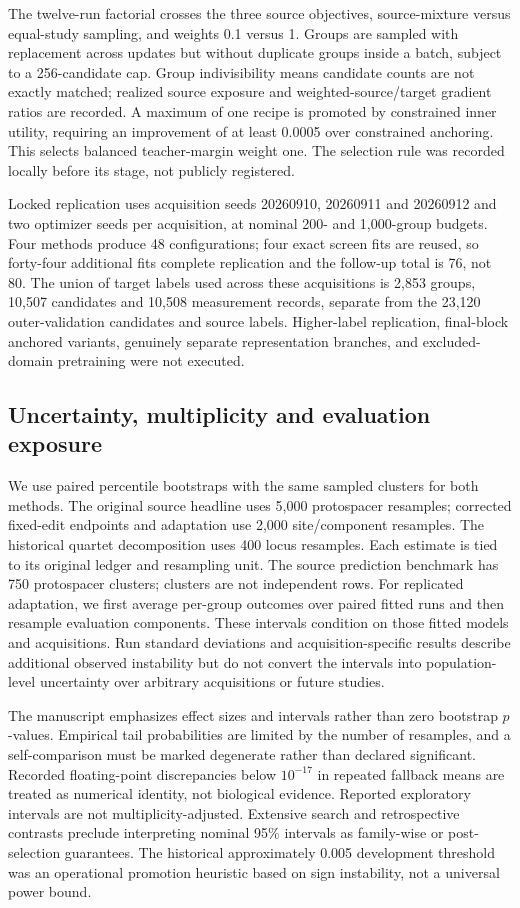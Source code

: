 The twelve-run factorial crosses the three source objectives, source-mixture versus equal-study sampling, and weights 0.1 versus 1. Groups are sampled with replacement across updates but without duplicate groups inside a batch, subject to a 256-candidate cap. Group indivisibility means candidate counts are not exactly matched; realized source exposure and weighted-source/target gradient ratios are recorded. A maximum of one recipe is promoted by constrained inner utility, requiring an improvement of at least 0.0005 over constrained anchoring. This selects balanced teacher-margin weight one. The selection rule was recorded locally before its stage, not publicly registered.

Locked replication uses acquisition seeds 20260910, 20260911 and 20260912 and two optimizer seeds per acquisition, at nominal 200- and 1,000-group budgets. Four methods produce 48 configurations; four exact screen fits are reused, so forty-four additional fits complete replication and the follow-up total is 76, not 80. The union of target labels used across these acquisitions is 2,853 groups, 10,507 candidates and 10,508 measurement records, separate from the 23,120 outer-validation candidates and source labels. Higher-label replication, final-block anchored variants, genuinely separate representation branches, and excluded-domain pretraining were not executed.

\subsection{Uncertainty, multiplicity and evaluation exposure}
We use paired percentile bootstraps with the same sampled clusters for both methods. The original source headline uses 5,000 protospacer resamples; corrected fixed-edit endpoints and adaptation use 2,000 site/component resamples. The historical quartet decomposition uses 400 locus resamples. Each estimate is tied to its original ledger and resampling unit. The source prediction benchmark has 750 protospacer clusters; clusters are not independent rows. For replicated adaptation, we first average per-group outcomes over paired fitted runs and then resample evaluation components. These intervals condition on those fitted models and acquisitions. Run standard deviations and acquisition-specific results describe additional observed instability but do not convert the intervals into population-level uncertainty over arbitrary acquisitions or future studies.

The manuscript emphasizes effect sizes and intervals rather than zero bootstrap $p$-values. Empirical tail probabilities are limited by the number of resamples, and a self-comparison must be marked degenerate rather than declared significant. Recorded floating-point discrepancies below $10^{-17}$ in repeated fallback means are treated as numerical identity, not biological evidence. Reported exploratory intervals are not multiplicity-adjusted. Extensive search and retrospective contrasts preclude interpreting nominal 95\% intervals as family-wise or post-selection guarantees. The historical approximately 0.005 development threshold was an operational promotion heuristic based on sign instability, not a universal power bound.


